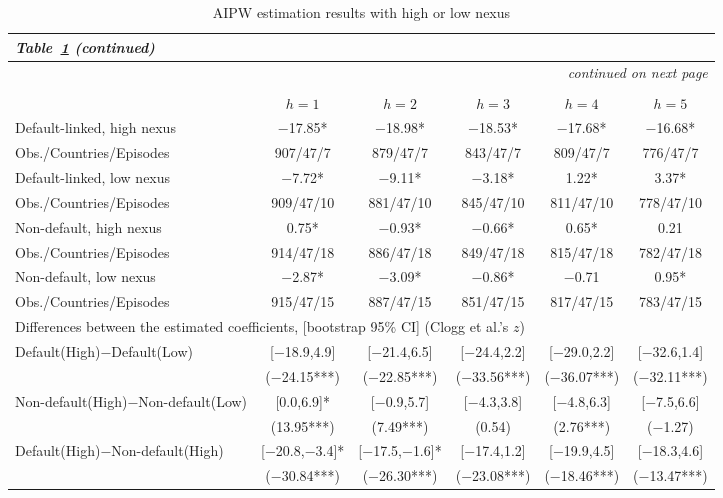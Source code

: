 \documentclass[12pt]{article}
\begin{document}
\begin{longtable}{lccccc}
\caption{AIPW estimation results with high or low nexus}\label{tab:nexus}\\
\endfirsthead
\multicolumn{6}{l}{\normalsize\textit{Table~\ref{tab:nexus} (continued)}} \\
\toprule
\endhead
\midrule
\multicolumn{6}{r}{\textit{continued on next page}} \\
\endfoot
\endlastfoot
\multicolumn{6}{c}{\large Panel A: GDP} \\
\toprule
 & $h=1$ & $h=2$ & $h=3$ & $h=4$ & $h=5$ \\
\midrule
Default-linked, high nexus & $-$17.85* & $-$18.98* & $-$18.53* & $-$17.68* & $-$16.68* \\
Obs./Countries/Episodes & 907/47/7 & 879/47/7 & 843/47/7 & 809/47/7 & 776/47/7 \\[2pt]
Default-linked, low nexus & $-$7.72* & $-$9.11* & $-$3.18* & 1.22* & 3.37* \\
Obs./Countries/Episodes & 909/47/10 & 881/47/10 & 845/47/10 & 811/47/10 & 778/47/10 \\[2pt]
Non-default, high nexus & 0.75* & $-$0.93* & $-$0.66* & 0.65* & 0.21 \\
Obs./Countries/Episodes & 914/47/18 & 886/47/18 & 849/47/18 & 815/47/18 & 782/47/18 \\[2pt]
Non-default, low nexus & $-$2.87* & $-$3.09* & $-$0.86* & $-$0.71 & 0.95* \\
Obs./Countries/Episodes & 915/47/15 & 887/47/15 & 851/47/15 & 817/47/15 & 783/47/15 \\[4pt]
\multicolumn{6}{l}{Differences between the estimated coefficients, [bootstrap 95\% CI] (Clogg et al.'s $z$)} \\[2pt]
Default(High)$-$Default(Low) & [$-$18.9,4.9] & [$-$21.4,6.5] & [$-$24.4,2.2] & [$-$29.0,2.2] & [$-$32.6,1.4] \\
 & ($-$24.15***) & ($-$22.85***) & ($-$33.56***) & ($-$36.07***) & ($-$32.11***) \\[2pt]
Non-default(High)$-$Non-default(Low) & [0.0,6.9]* & [$-$0.9,5.7] & [$-$4.3,3.8] & [$-$4.8,6.3] & [$-$7.5,6.6] \\
 & (13.95***) & (7.49***) & (0.54) & (2.76***) & ($-$1.27) \\[6pt]
Default(High)$-$Non-default(High) & [$-$20.8,$-$3.4]* & [$-$17.5,$-$1.6]* & [$-$17.4,1.2] & [$-$19.9,4.5] & [$-$18.3,4.6] \\
 & ($-$30.84***) & ($-$26.30***) & ($-$23.08***) & ($-$18.46***) & ($-$13.47***) \\[2pt]

\end{longtable}
\end{document}
